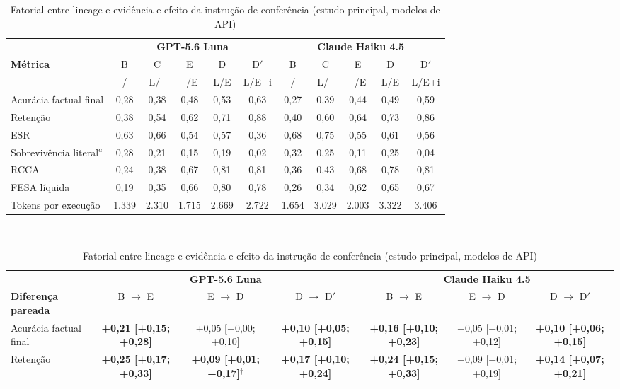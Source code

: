 \begin{table}[t]
\caption{Fatorial entre lineage e evidência e efeito da instrução de conferência (estudo principal, modelos de API)}
\label{tab:fatorial}
\centering
\footnotesize
\setlength{\tabcolsep}{3.2pt}
\begin{tabular}{|l|ccccc|ccccc|}
\hline
 & \multicolumn{5}{c|}{\textbf{GPT-5.6 Luna}} & \multicolumn{5}{c|}{\textbf{Claude Haiku 4.5}} \\
\textbf{Métrica} & B & C & E & D & D$'$ & B & C & E & D & D$'$ \\
\multicolumn{1}{|l|}{} & \scriptsize --/-- & \scriptsize L/-- & \scriptsize --/E & \scriptsize L/E & \scriptsize L/E+i & \scriptsize --/-- & \scriptsize L/-- & \scriptsize --/E & \scriptsize L/E & \scriptsize L/E+i \\
\hline
Acurácia factual final & 0,28 & 0,38 & 0,48 & 0,53 & 0,63 & 0,27 & 0,39 & 0,44 & 0,49 & 0,59 \\
Retenção & 0,38 & 0,54 & 0,62 & 0,71 & 0,88 & 0,40 & 0,60 & 0,64 & 0,73 & 0,86 \\
ESR & 0,63 & 0,66 & 0,54 & 0,57 & 0,36 & 0,68 & 0,75 & 0,55 & 0,61 & 0,56 \\
Sobrevivência literal$^{a}$ & 0,28 & 0,21 & 0,15 & 0,19 & 0,02 & 0,32 & 0,25 & 0,11 & 0,25 & 0,04 \\
RCCA & 0,24 & 0,38 & 0,67 & 0,81 & 0,81 & 0,36 & 0,43 & 0,68 & 0,78 & 0,81 \\
FESA líquida & 0,19 & 0,35 & 0,66 & 0,80 & 0,78 & 0,26 & 0,34 & 0,62 & 0,65 & 0,67 \\
Tokens por execução & 1.339 & 2.310 & 1.715 & 2.669 & 2.722 & 1.654 & 3.029 & 2.003 & 3.322 & 3.406 \\
\hline
\end{tabular}
\\[4pt]
{\scriptsize\setlength{\tabcolsep}{2pt}
\begin{tabular}{|l|ccc|ccc|}
\hline
 & \multicolumn{3}{c|}{\textbf{GPT-5.6 Luna}} & \multicolumn{3}{c|}{\textbf{Claude Haiku 4.5}} \\
\textbf{Diferença pareada} & B $\to$ E & E $\to$ D & D $\to$ D$'$ & B $\to$ E & E $\to$ D & D $\to$ D$'$ \\
\hline
Acurácia factual final & \textbf{+0,21 [+0,15; +0,28]} & +0,05 [$-$0,00; +0,10] & \textbf{+0,10 [+0,05; +0,15]} & \textbf{+0,16 [+0,10; +0,23]} & +0,05 [$-$0,01; +0,12] & \textbf{+0,10 [+0,06; +0,15]} \\
Retenção & \textbf{+0,25 [+0,17; +0,33]} & \textbf{+0,09 [+0,01; +0,17]}$^{\dagger}$ & \textbf{+0,17 [+0,10; +0,24]} & \textbf{+0,24 [+0,15; +0,33]} & +0,09 [$-$0,01; +0,19] & \textbf{+0,14 [+0,07; +0,21]} \\

\end{tabular}}
\end{table}
